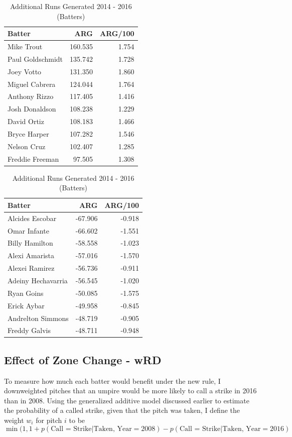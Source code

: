 \documentclass[11pt]{article}
\begin{document}
\begin{table}[ht]
\centering
\begin{tabular}{lrr}
  \hline
Batter & ARG & ARG/100 \\ 
  \hline
Mike Trout & 160.535 & 1.754 \\ 
  Paul Goldschmidt & 135.742 & 1.728 \\ 
  Joey Votto & 131.350 & 1.860 \\ 
  Miguel Cabrera & 124.044 & 1.764 \\ 
  Anthony Rizzo & 117.405 & 1.416 \\ 
  Josh Donaldson & 108.238 & 1.229 \\ 
  David Ortiz & 108.183 & 1.466 \\ 
  Bryce Harper & 107.282 & 1.546 \\ 
  Nelson Cruz & 102.407 & 1.285 \\ 
  Freddie Freeman & 97.505 & 1.308 \\ 
   \hline
\end{tabular}
\quad
\begin{tabular}{lrr}
  \hline
Batter & ARG & ARG/100 \\ 
  \hline
Alcides Escobar & -67.906 & -0.918 \\ 
  Omar Infante & -66.602 & -1.551 \\ 
  Billy Hamilton & -58.558 & -1.023 \\ 
  Alexi Amarista & -57.016 & -1.570 \\ 
  Alexei Ramirez & -56.736 & -0.911 \\ 
  Adeiny Hechavarria & -56.545 & -1.020 \\ 
  Ryan Goins & -50.085 & -1.575 \\ 
  Erick Aybar & -49.958 & -0.845 \\ 
  Andrelton Simmons & -48.719 & -0.905 \\ 
  Freddy Galvis & -48.711 & -0.948 \\ 
   \hline
\end{tabular}
\caption{Additional Runs Generated 2014 - 2016 (Batters)}
\end{table}

\subsection{Effect of Zone Change - wRD}

To measure how much each batter would benefit under the new rule, I downweighted pitches that an umpire would be more likely to call a strike in 2016 than in 2008.  Using the generalized additive model discussed earlier to estimate the probability of a called strike, given that the pitch was taken, I define the weight $w_i$ for pitch $i$ to be 
$$ \min(1, 1 + p(\text{Call = Strike} | \text{Taken, Year} = 2008) -  p(\text{Call = Strike} | \text{Taken, Year} = 2016)$$  
\end{document}
